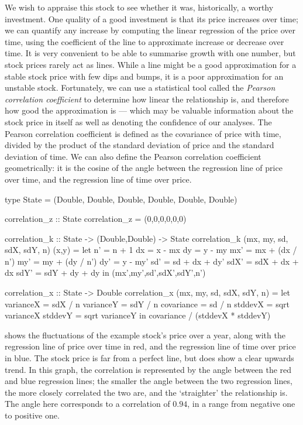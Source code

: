 We wish to appraise this stock to see whether it was, historically, a worthy investment.
One quality of a good investment is that its price increases over time; we can quantify any increase by computing the linear regression of the price over time, using the coefficient of the line to approximate increase or decrease over time.
It is very convenient to be able to summarise growth with one number, but stock prices rarely act as lines.
While a line might be a good approximation for a stable stock price with few dips and bumps, it is a poor approximation for an unstable stock.
Fortunately, we can use a statistical tool called the \emph{Pearson correlation coefficient} to determine how linear the relationship is, and therefore how good the approximation is --- which may be valuable information about the stock price in itself as well as denoting the confidence of our analyses.
The Pearson correlation coefficient is defined as the covariance of price with time, divided by the product of the standard deviation of price and the standard deviation of time.
We can also define the Pearson correlation coefficient geometrically: it is the cosine of the angle between the regression line of price over time, and the regression line of time over price.


\begin{haskell}[float,label=figs/impl/correlation,caption=One-pass correlation implementation]
type State = (Double, Double, Double, Double, Double, Double)

correlation_z :: State
correlation_z = (0,0,0,0,0,0)

correlation_k :: State -> (Double,Double) -> State
correlation_k (mx, my, sd, sdX, sdY, n) (x,y) =
 let n'   = n   + 1
     dx   = x   - mx
     dy   = y   - my
     mx'  = mx  + (dx / n')
     my'  = my  + (dy / n')
     dy'  = y   - my'
     sd'  = sd  + dx + dy'
     sdX' = sdX + dx + dx
     sdY' = sdY + dy + dy
 in (mx',my',sd',sdX',sdY',n')

correlation_x :: State -> Double
correlation_x (mx, my, sd, sdX, sdY, n) =
  let varianceX  = sdX / n
      varianceY  = sdY / n
      covariance = sd  / n
      stddevX = sqrt varianceX
      stddevY = sqrt varianceY
  in covariance / (stddevX * stddevY)
\end{haskell}


 shows the fluctuations of the example stock's price over a year, along with the regression line of price over time in red, and the regression line of time over price in blue.
The stock price is far from a perfect line, but does show a clear upwards trend.
In this graph, the correlation is represented by the angle between the red and blue regression lines; the smaller the angle between the two regression lines, the more closely correlated the two are, and the `straighter' the relationship is.
The angle here corresponds to a correlation of $0.94$, in a range from negative one to positive one.


